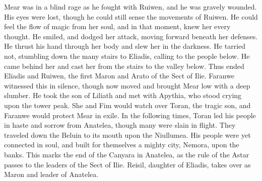 \documentclass[smalldemyvopaper,11pt,twoside,onecolumn,openright,extrafontsizes]{memoir}
\begin{document}
{{Mear was in a blind rage as he fought with Ruiwen, and he was gravely wounded. His eyes were lost, though he could still sense the movements of Ruiwen. He could feel the flow of magic from her soul, and in that moment, knew her every thought. He smiled, and dodged her attack, moving forward beneath her defenses. He thrust his hand through her body and slew her in the darkness. He tarried not, stumbling down the many stairs to Eliadis, calling to the people below. He came behind her and cast her from the stairs to the valley below. Thus ended Eliadis and Ruiwen, the first Maron and Arato of the Sect of Ilie. Faranwe witnessed this in silence, though now moved and brought Mear low with a deep slumber. He took the son of Liliath and met with Apythia, who stood crying upon the tower peak. She and Fim would watch over Toran, the tragic son, and Faranwe would protect Mear in exile.
In the following times, Toran led his people in haste and sorrow from Anatelea, though many were slain in flight. They traveled down the Beluin to its mouth upon the Niullumea. His people were yet connected in soul, and built for themselves a mighty city, Nemora, upon the banks. This marks the end of the Canyara in Anatelea, as the rule of the Astar passes to the leaders of the Sect of Ilie. Reisil, daughter of Eliadis, takes over as Maron and leader of Anatelea.

}}
\end{document}
